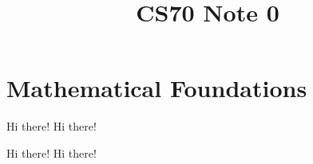 \documentclass[12pt, letterpaper]{article}
\title{CS70 Note 0}
\begin{document}
\maketitle

\section*{Mathematical Foundations}
Hi there!
Hi there!

Hi there!
Hi there!
\end{document}
